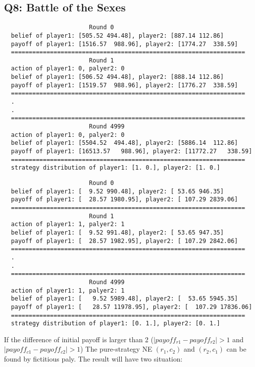 \documentclass[a4paper, oneside, final, 12pt]{scrartcl} %
\begin{document}
\newpage

\subsection{Q8: Battle of the Sexes}

\begin{lstlisting}
                        Round 0
  belief of player1: [505.52 494.48], player2: [887.14 112.86]
  payoff of player1: [1516.57  988.96], player2: [1774.27  338.59]
  ==================================================================
                        Round 1
  action of player1: 0, palyer2: 0
  belief of player1: [506.52 494.48], player2: [888.14 112.86]
  payoff of player1: [1519.57  988.96], player2: [1776.27  338.59]
  ==================================================================
  .
  .
  ==================================================================
                        Round 4999
  action of player1: 0, palyer2: 0
  belief of player1: [5504.52  494.48], player2: [5886.14  112.86]
  payoff of player1: [16513.57   988.96], player2: [11772.27   338.59]
  ==================================================================
  strategy distribution of player1: [1. 0.], player2: [1. 0.]
\end{lstlisting}

\begin{lstlisting}
                        Round 0
  belief of player1: [  9.52 990.48], player2: [ 53.65 946.35]
  payoff of player1: [  28.57 1980.95], player2: [ 107.29 2839.06]
  ==================================================================
                        Round 1
  action of player1: 1, palyer2: 1
  belief of player1: [  9.52 991.48], player2: [ 53.65 947.35]
  payoff of player1: [  28.57 1982.95], player2: [ 107.29 2842.06]
  ==================================================================
  .
  .
  ==================================================================
                        Round 4999
  action of player1: 1, palyer2: 1
  belief of player1: [   9.52 5989.48], player2: [  53.65 5945.35]
  payoff of player1: [   28.57 11978.95], player2: [  107.29 17836.06]
  ==================================================================
  strategy distribution of player1: [0. 1.], player2: [0. 1.]
\end{lstlisting}

\begingroup
\raggedright
If the difference of initial payoff is larger than 2
($|payoff_{r1} - payoff_{r2}| > 1$ and $|payoff_{c1} - payoff_{c2}| > 1$)
The pure-strategy NE $(r_1, c_2)$ and $(r_2, c_1)$ can be found by fictitious paly.
The result will have two situation:
\end{document}

